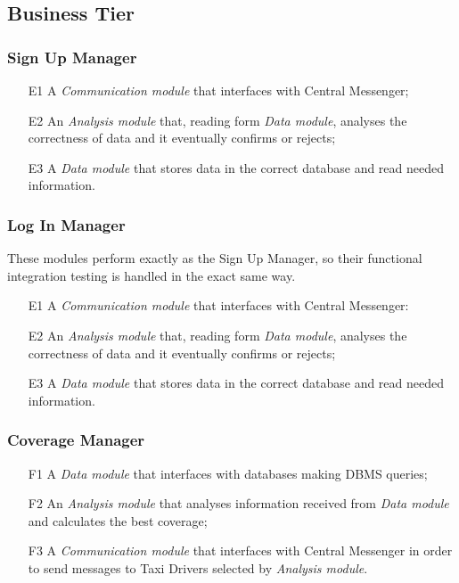 \subsection{Business Tier}
\subsubsection{Sign Up Manager}
\begin{itemize}
\item [E1] A \emph{Communication module} that interfaces with Central Messenger;
\item [E2] An \emph{Analysis module} that, reading form \emph{Data module}, analyses the correctness of data and it eventually confirms or rejects;
\item [E3] A \emph{Data module} that stores data in the correct database and read needed information.
\end{itemize}

\subsubsection{Log In Manager}
These modules perform exactly as the Sign Up Manager, so their functional integration testing is handled in the exact same way.
\begin{itemize}
\item [E1] A \emph{Communication module} that interfaces with Central Messenger:
\item [E2] An \emph{Analysis module} that, reading form \emph{Data module}, analyses the correctness of data and it eventually confirms or rejects;
\item [E3] A \emph{Data module} that stores data in the correct database and read needed information.
\end{itemize}

\subsubsection{Coverage Manager}
\begin{itemize}
\item [F1] A \emph{Data module} that interfaces with databases making DBMS queries;
\item [F2] An \emph{Analysis module} that analyses information received from \emph{Data module} and calculates the best coverage;
\item [F3] A \emph{Communication module} that interfaces with Central Messenger in order to send messages to Taxi Drivers selected by \emph{Analysis module}.
\end{itemize}

